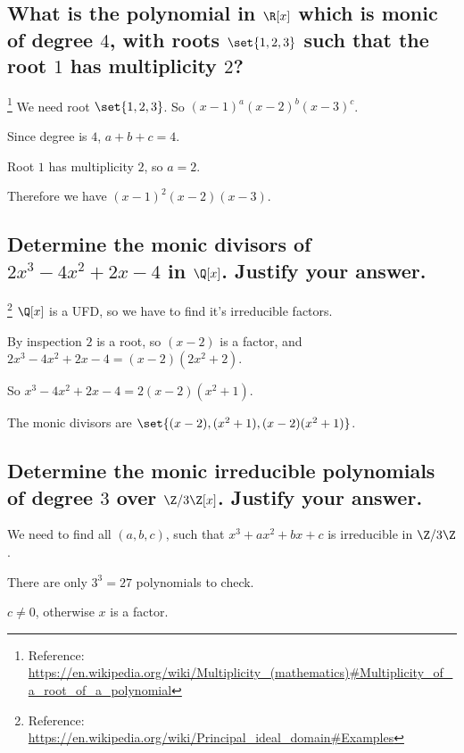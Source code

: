 \section[Problem 1]{}
    \subsection[(i)]{What is the polynomial in $\R[x]$ which is monic of degree $4$,
        with roots $\set{1,2,3}$ such that the root $1$ has multiplicity $2$?}
        \footnote{Reference: \url{https://en.wikipedia.org/wiki/Multiplicity_(mathematics)\#Multiplicity_of_a_root_of_a_polynomial}}
        We need root $\set{1,2,3}$.
        So $(x-1)^a (x-2)^b (x-3)^c$.

        Since degree is $4$, $a+b+c = 4$.

        Root $1$ has multiplicity $2$, so $a = 2$.

        Therefore we have $(x-1)^2 (x-2) (x-3)$.

    \subsection[(ii)]{Determine the monic divisors of $2x^3 - 4x^2 + 2x - 4$ in $\Q[x]$.
        Justify your answer.}
        \footnote{Reference: \url{https://en.wikipedia.org/wiki/Principal_ideal_domain\#Examples}}
        $\Q[x]$ is a UFD, so we have to find it's irreducible factors.

        By inspection $2$ is a root, so $(x-2)$ is a factor,
        and $2x^3 - 4x^2 + 2x - 4 = (x-2)(2x^2 + 2)$.

        So $x^3 - 4x^2 + 2x - 4 = 2(x-2)(x^2 + 1)$.

        The monic divisors are $\set{(x-2), (x^2+1), (x-2)(x^2+1)}$.
        

    \subsection[(iii)]{Determine the monic irreducible polynomials of degree $3$ over $\Z/3\Z[x]$.
        Justify your answer.}

        We need to find all $(a,b,c)$,
        such that $x^3 + ax^2 + bx + c$ is irreducible in $\Z / 3\Z$.

        There are only $3^3 = 27$ polynomials to check.

        $c \neq 0$, otherwise $x$ is a factor.

